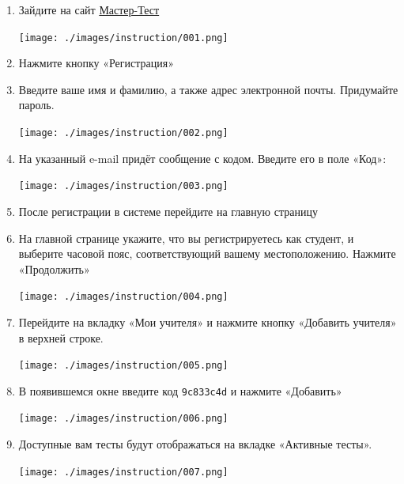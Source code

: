 \documentclass[
  12pt,
]{book}
\begin{document}
\begin{enumerate}
\def\labelenumi{\arabic{enumi}.}
\item
  Зайдите на сайт \href{https://master-test.net/ru}{Мастер-Тест}

  \texttt{[image: ./images/instruction/001.png]}
\item
  Нажмите кнопку «Регистрация»
\item
  Введите ваше имя и фамилию, а также адрес электронной почты. Придумайте пароль.

  \texttt{[image: ./images/instruction/002.png]}
\item
  На указанный e-mail придёт сообщение с кодом. Введите его в поле «Код»:

  \texttt{[image: ./images/instruction/003.png]}
\item
  После регистрации в системе перейдите на главную страницу
\item
  На главной странице укажите, что вы регистрируетесь как студент, и выберите часовой пояс, соответствующий вашему местоположению. Нажмите «Продолжить»

  \texttt{[image: ./images/instruction/004.png]}
\item
  Перейдите на вкладку «Мои учителя» и нажмите кнопку «Добавить учителя» в верхней строке.

  \texttt{[image: ./images/instruction/005.png]}
\item
  В появившемся окне введите код \texttt{9c833c4d} и нажмите «Добавить»

  \texttt{[image: ./images/instruction/006.png]}
\item
  Доступные вам тесты будут отображаться на вкладке «Активные тесты».

  \texttt{[image: ./images/instruction/007.png]}
\end{enumerate}

  
\end{document}
